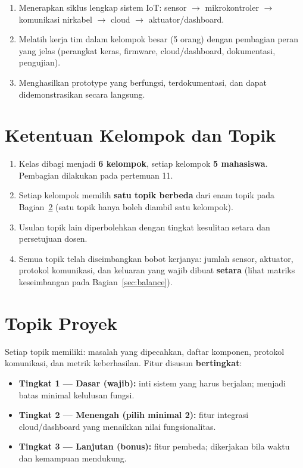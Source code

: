 \documentclass[11pt,a4paper]{article}
\begin{document}
\begin{enumerate}
  \item Menerapkan siklus lengkap sistem IoT: sensor $\rightarrow$
        mikrokontroler $\rightarrow$ komunikasi nirkabel $\rightarrow$ cloud
        $\rightarrow$ aktuator/dashboard.
  \item Melatih kerja tim dalam kelompok besar (5 orang) dengan pembagian
        peran yang jelas (perangkat keras, firmware, cloud/dashboard,
        dokumentasi, pengujian).
  \item Menghasilkan prototype yang berfungsi, terdokumentasi, dan dapat
        didemonstrasikan secara langsung.
\end{enumerate}

\section{Ketentuan Kelompok dan Topik}

\begin{enumerate}
  \item Kelas dibagi menjadi \textbf{6 kelompok}, setiap kelompok
        \textbf{5 mahasiswa}. Pembagian dilakukan pada pertemuan 11.
  \item Setiap kelompok memilih \textbf{satu topik berbeda} dari enam topik
        pada Bagian~\ref{sec:topik} (satu topik hanya boleh diambil satu
        kelompok).
  \item Usulan topik lain diperbolehkan dengan tingkat kesulitan setara dan
        persetujuan dosen.
  \item Semua topik telah diseimbangkan bobot kerjanya: jumlah sensor,
        aktuator, protokol komunikasi, dan keluaran yang wajib dibuat
        \textbf{setara} (lihat matriks keseimbangan pada
        Bagian~\ref{sec:balance}).
\end{enumerate}

\section{Topik Proyek}\label{sec:topik}

Setiap topik memiliki: masalah yang dipecahkan, daftar komponen, protokol
komunikasi, dan metrik keberhasilan. Fitur disusun \textbf{bertingkat}:

\begin{itemize}
  \item \textbf{Tingkat 1 --- Dasar (wajib):} inti sistem yang harus berjalan;
        menjadi batas minimal kelulusan fungsi.
  \item \textbf{Tingkat 2 --- Menengah (pilih minimal 2):} fitur integrasi
        cloud/dashboard yang menaikkan nilai fungsionalitas.
  \item \textbf{Tingkat 3 --- Lanjutan (bonus):} fitur pembeda; dikerjakan
        bila waktu dan kemampuan mendukung.
\end{itemize}
\end{document}
